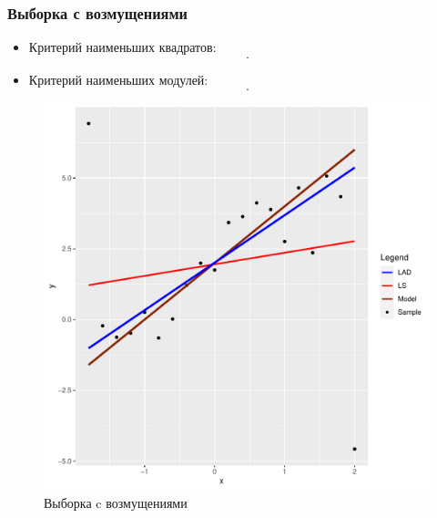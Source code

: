 \documentclass[a4paper]{article}
\begin{document}
\subsubsection{Выборка с возмущениями}
\begin{itemize}
    \item Критерий наименьших квадратов:
    \[
    .
    \]
    \item Критерий наименьших модулей:
    \[
    .
    \]
\end{itemize}
\begin{figure}[H]
    \centering
    \includegraphics[width = 12 cm ]{LabSrcs/resources/perturbated_sample_regression.pdf}
    \caption{Выборка c возмущениями}
    \label{fig:perr}
\end{figure}
\end{document}

